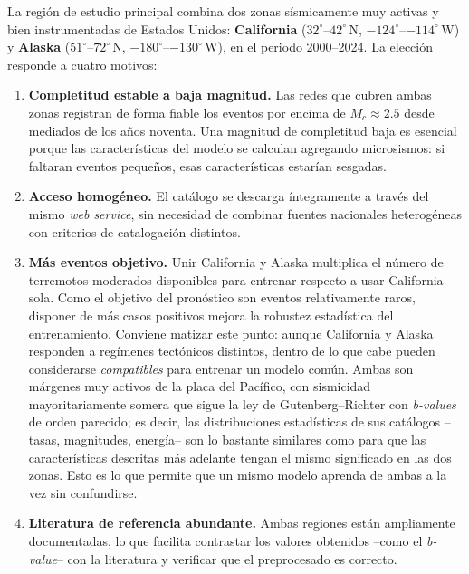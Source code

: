 La región de estudio principal combina dos zonas sísmicamente muy activas y bien
instrumentadas de Estados Unidos: \textbf{California} (\(32^{\circ}\)--\(42^{\circ}\,\)N,
\(-124^{\circ}\)--\(-114^{\circ}\,\)W) y \textbf{Alaska} (\(51^{\circ}\)--\(72^{\circ}\,\)N,
\(-180^{\circ}\)--\(-130^{\circ}\,\)W), en el periodo 2000--2024. La elección responde a
cuatro motivos:

\begin{enumerate}
  \item \textbf{Completitud estable a baja magnitud.} Las redes que cubren ambas zonas
        registran de forma fiable los eventos por encima de \(M_c \approx 2.5\) desde
        mediados de los años noventa. Una magnitud de completitud baja es esencial porque
        las características del modelo se calculan agregando microsismos: si faltaran
        eventos pequeños, esas características estarían sesgadas.
  \item \textbf{Acceso homogéneo.} El catálogo se descarga íntegramente a través del mismo
        \textit{web service}, sin necesidad de combinar fuentes nacionales heterogéneas con
        criterios de catalogación distintos.
  \item \textbf{Más eventos objetivo.} Unir California y Alaska multiplica el número de
        terremotos moderados disponibles para entrenar respecto a usar California sola. Como
        el objetivo del pronóstico son eventos relativamente raros, disponer de más casos
        positivos mejora la robustez estadística del entrenamiento. Conviene matizar este
        punto: aunque California y Alaska responden a regímenes tectónicos distintos, dentro
        de lo que cabe pueden considerarse \emph{compatibles} para entrenar un modelo común.
        Ambas son márgenes muy activos de la placa del Pacífico, con sismicidad
        mayoritariamente somera que sigue la ley de Gutenberg--Richter con \textit{b-values}
        de orden parecido; es decir, las distribuciones estadísticas de sus catálogos --tasas,
        magnitudes, energía-- son lo bastante similares como para que las características
        descritas más adelante tengan el mismo significado en las dos zonas. Esto es lo que
        permite que un mismo modelo aprenda de ambas a la vez sin confundirse.
  \item \textbf{Literatura de referencia abundante.} Ambas regiones están ampliamente
        documentadas, lo que facilita contrastar los valores obtenidos --como el
        \textit{b-value}-- con la literatura y verificar que el preprocesado es correcto.
\end{enumerate}

